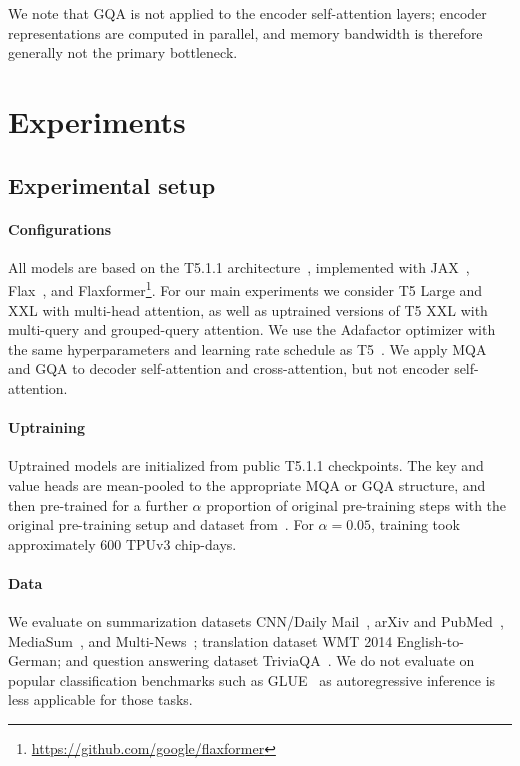 \documentclass[11pt]{article}
\newcommand{\mq}{\textsc{MQA}\xspace}
\newcommand{\gmq}{\textsc{GQA}\xspace}
\newcommand{\upprop}{\alpha}
\begin{document}
We note that \gmq is not applied to the encoder self-attention layers; encoder representations are computed in parallel, and memory bandwidth is therefore generally not the primary bottleneck.

\section{Experiments}
\label{section:experiments}

\subsection{Experimental setup}

\paragraph{Configurations}
All models are based on the T5.1.1 architecture~\citep{t5}, implemented with JAX~\citep{jax}, Flax~\citep{flax}, and Flaxformer\footnote{\url{https://github.com/google/flaxformer}}. For our main experiments we consider T5 Large and XXL with multi-head attention, as well as uptrained versions of T5 XXL with multi-query and grouped-query attention. We use the Adafactor optimizer with the same hyperparameters and learning rate schedule as T5~\citep{t5}. We apply \mq and \gmq to decoder self-attention and cross-attention, but not encoder self-attention.

\paragraph{Uptraining}

Uptrained models are initialized from public T5.1.1 checkpoints. The key and value heads are mean-pooled to the appropriate \mq or \gmq structure, and then pre-trained for a further 
$\upprop$ proportion of original pre-training steps with the original pre-training setup and dataset from~\citep{t5}. For $\upprop=0.05$, training took approximately 600 TPUv3 chip-days.

\paragraph{Data}
We evaluate on summarization datasets CNN/Daily Mail~\citep{cnn}, arXiv and PubMed~\citep{arxiv}, MediaSum~\citep{mediasum}, and Multi-News~\citep{multinews}; translation dataset WMT 2014  English-to-German; and question answering dataset TriviaQA~\citep{triviaqa}. We do not evaluate on popular classification benchmarks such as GLUE~\citep{glue} as autoregressive inference is less applicable for those tasks. 
\end{document}
